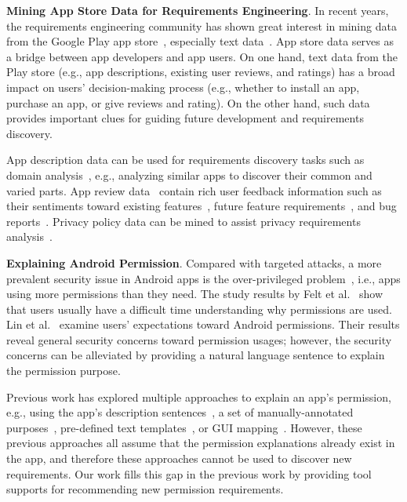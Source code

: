 
\textbf{Mining App Store Data for Requirements Engineering}. 
In recent years, the requirements engineering community has shown great interest in mining data from the Google Play app store~\cite{tian2015characteristics}, especially text data~\cite{conf/re/MasseyEAS13,bhatia2016mining,conf/re/EvansBWB17,guzman2014users}. 
App store data serves as a bridge between app developers and app users. 
On one hand, text data from the Play store (e.g., app descriptions, existing user reviews, and ratings) has a broad impact on users' decision-making process (e.g., whether to install an app, purchase an app, or give reviews and rating). On the other hand, such data provides important clues for guiding future development and requirements discovery. 

App description data can be used for requirements discovery tasks such as domain analysis~\cite{journals/tse/HaririCMCM13}, e.g., analyzing similar apps to discover their common and varied parts. App review data~\cite{harman2012app,conf/re/PaganoM13,conf/icse/CarrenoW13,guzman2014users,conf/re/MaalejN15,DBLP:conf/re/JohannSBM17}  contain rich user feedback information such as their sentiments toward existing features~\cite{guzman2014users}, future feature requirements~\cite{conf/icse/CarrenoW13}, and bug reports~\cite{conf/re/MaalejN15}. Privacy policy data can be mined to assist privacy requirements analysis~\cite{journals/re/AntonE04,conf/re/MasseyEAS13,bhatia2017data,bhatia2016mining,conf/re/EvansBWB17,conf/ndss/ZimmeckWZI0SWSB17,slavin2016toward}. 

\textbf{Explaining Android Permission}. 
Compared with targeted attacks, a more prevalent security issue in Android apps is the over-privileged problem~\cite{conf/ccs/FeltCHSW11}, i.e., apps using more permissions than they need. 
The study results by Felt et al.~\cite{conf/soups/FeltHEHCW12} show that users usually have a difficult time understanding why permissions are used. Lin et al.~\cite{conf/huc/LinSALHZ12,conf/soups/LinLSH14} examine users' expectations toward Android permissions. 
Their results reveal general security concerns toward permission usages; however, the security concerns can be alleviated by providing a natural language sentence to explain the permission purpose. 

Previous work has explored multiple approaches to explain an app's permission, e.g., using the app's description sentences~\cite{conf/uss/PanditaXYEX13,conf/ccs/QuRZCZC14}, a set of manually-annotated purposes~\cite{conf/huc/WangHG15}, pre-defined text templates~\cite{conf/ccs/ZhangDFY15}, or GUI mapping~\cite{conf/huc/LiGC16}. However, these previous approaches all assume that the permission explanations already exist in the app, and therefore these approaches cannot be used to discover new requirements. 
Our work fills this gap in the previous work by providing tool supports for recommending new permission requirements. 

